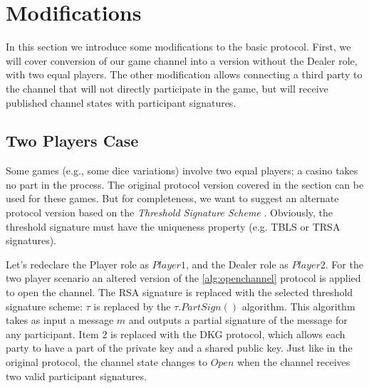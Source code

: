 \section{Modifications}
In this section we introduce some modifications to the basic protocol. First, we will cover conversion of our game channel into a version without the Dealer role, with two equal players. The other modification allows connecting a third party to the channel that will not directly participate in the game, but will receive published channel states with participant signatures. 

\subsection{Two Players Case}
Some games (e.g., some dice variations) involve two equal players; a casino takes no part in the process. The original protocol version covered in the  section can be used for these games. But for completeness, we want to suggest an alternate protocol version based on the  \textit {Threshold Signature Scheme} \cite{bib22}. Obviously, the threshold signature must have the uniqueness property (e.g. TBLS or TRSA \cite{bib23} signatures).

Let’s redeclare the Player role as $Player1$, and the Dealer role as $Player2$. For the two player scenario an altered version of the \autoref{alg:openchannel} protocol is applied to open the channel. The RSA signature is replaced with the selected threshold signature scheme: $ \tau $ is replaced by the $\tau.PartSign()$ algorithm. This algorithm takes as input a message $m$ and outputs a partial signature of the message for any participant. Item 2 is replaced with the DKG protocol, which allows each party to have a part of the private key and a shared public key. Just like in the original protocol, the channel state changes to $Open$ when the channel receives two valid participant signatures. 

